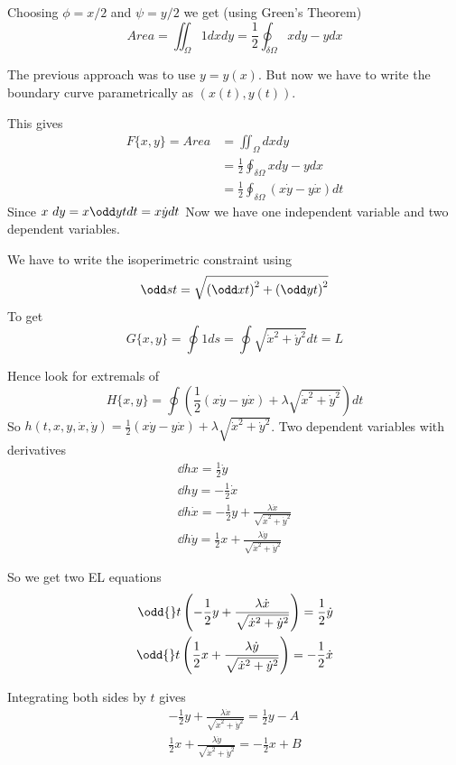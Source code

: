 \documentclass{E:/Documents/Latex/myassignment}
\begin{document}
Choosing $\phi = x/2$ and $\psi = y/2$ we get (using Green's Theorem)
\[Area = \iint_{\Omega} 1 dxdy = \frac12 \oint_{\delta\Omega} xdy - ydx\]

The previous approach was to use $y = y(x)$. But now we have to write the boundary curve parametrically as $(x(t),y(t))$.

This gives
\begin{align*}
	F\{x,y\} = Area &= \iint_{\Omega} dxdy\\
	&= \frac12 \oint_{\delta\Omega} xdy - ydx\\
	&= \frac12 \oint_{\delta\Omega} (x\dot y - y \dot x) dt
\end{align*}
Since $x\ dy = x\odd yt dt = x\dot y dt$
Now we have one independent variable and two dependent variables.

We have to write the isoperimetric constraint using
\[\odd st = \sqrt{\left(\odd xt\right)^2 + \left(\odd yt\right)^2}\]
To get
\[G\{x,y\} = \oint 1 ds = \oint \sqrt{\dot x^2 + \dot y ^2} dt = L\]


Hence look for extremals of
\[H\{x,y\} = \oint \left(\frac12 (x\dot y - y\dot x) + \lambda \sqrt{\dot x ^2 + \dot y^2}\right) dt\]
So $h(t,x,y,\dot x,\dot y) = \frac12 (x\dot y - y\dot x) + \lambda \sqrt{\dot x ^2 + \dot y^2}$. Two dependent variables with derivatives
\begin{align*}
	\dd hx = \frac12 \dot y\\
	\dd hy = -\frac12 \dot x\\
	\dd h{\dot x} = -\frac12 y + \frac{\lambda \dot x}{\sqrt{\dot x^2 + \dot y^2}}\\
	\dd h{\dot y} = \frac12 x + \frac{\lambda \dot y}{\sqrt{\dot x^2 + \dot y^2}}
\end{align*}

So we get two EL equations
\begin{align*}
	\odd{}t \left(-\frac12 y + \frac{\lambda \dot x}{\sqrt{\dot x^2 + \dot y^2}}\right) = \frac12 \dot y\\
	\odd{}t \left(\frac12 x + \frac{\lambda \dot y}{\sqrt{\dot x^2 + \dot y^2}}\right) = -\frac12 \dot x\\
\end{align*}

Integrating both sides by $t$ gives
\begin{align*}
	-\frac12 y + \frac{\lambda \dot x}{\sqrt{\dot x^2 + \dot y^2}} = \frac12 y - A\\
	\frac12 x + \frac{\lambda \dot y}{\sqrt{\dot x^2 + \dot y^2}} = -\frac12 x + B
\end{align*}
\end{document}
